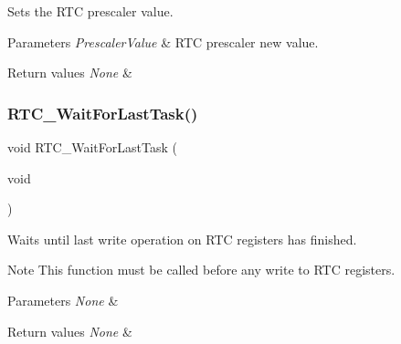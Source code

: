 Sets the R\+TC prescaler value. 


\begin{DoxyParams}{Parameters}
{\em Prescaler\+Value} & R\+TC prescaler new value. \\
\hline
\end{DoxyParams}

\begin{DoxyRetVals}{Return values}
{\em None} & \\
\hline
\end{DoxyRetVals}
\mbox{\label{group___r_t_c___exported___functions_gaa0a406ef860d5231748c5f0d82673036}} 
\subsubsection{\texorpdfstring{RTC\_WaitForLastTask()}{RTC\_WaitForLastTask()}}
{\footnotesize\ttfamily void R\+T\+C\+\_\+\+Wait\+For\+Last\+Task (\begin{DoxyParamCaption}\item[{void}]{ }\end{DoxyParamCaption})}



Waits until last write operation on R\+TC registers has finished. 

\begin{DoxyNote}{Note}
This function must be called before any write to R\+TC registers. 
\end{DoxyNote}

\begin{DoxyParams}{Parameters}
{\em None} & \\
\hline
\end{DoxyParams}

\begin{DoxyRetVals}{Return values}
{\em None} & \\
\hline
\end{DoxyRetVals}
\mbox{\label{group___r_t_c___exported___functions_gaca4346e0dc15dccc15179786b28450db}} 
